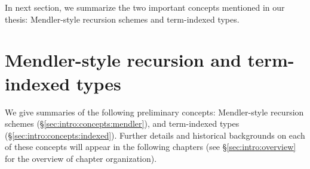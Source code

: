 In next section, we summarize the two important concepts mentioned
in our thesis: Mendler-style recursion schemes and term-indexed types.

\section{Mendler-style recursion and term-indexed types}
\label{sec:intro:concepts}
We give summaries of the following preliminary concepts:
Mendler-style recursion schemes (\S\ref{sec:intro:concepts:mendler}),
and term-indexed types (\S\ref{sec:intro:concepts:indexed}).
Further details and historical backgrounds on each of these concepts
will appear in the following chapters (see \S\ref{sec:intro:overview}
for the overview of chapter organization).

